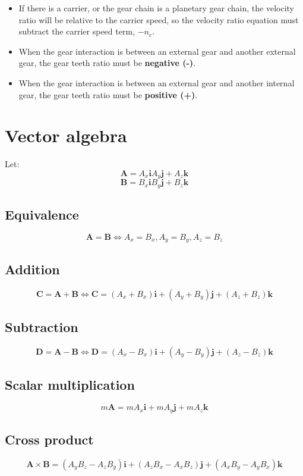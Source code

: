 \documentclass[11pt]{article}
\begin{document}
\begin{itemize}
\item If there is a carrier, or the gear chain is a planetary gear chain, the velocity ratio will be relative to the carrier speed, so the velocity ratio equation must subtract the carrier speed term, \(- n_c\).
\item When the gear interaction is between an external gear and another external gear, the gear teeth ratio must be \textbf{negative (-)}.
\item When the gear interaction is between an external gear and another internal gear, the gear teeth ratio must be \textbf{positive (+)}.
\end{itemize}

 \newpage
\section{Vector algebra}
\label{sec:org33b6696}
Let:
\[\boldsymbol{A} = A_x \boldsymbol{i} A_y \boldsymbol{j} + A_z \boldsymbol{k}\]
\[\boldsymbol{B} = B_x \boldsymbol{i} B_y \boldsymbol{j} + B_z \boldsymbol{k}\]
\subsection{Equivalence}
\label{sec:org7bd0be7}
\[\boldsymbol{A} = \boldsymbol{B} \Leftrightarrow A_x = B_x, A_y = B_y, A_z = B_z\]
\subsection{Addition}
\label{sec:orga506492}
\[\boldsymbol{C} = \boldsymbol{A} + \boldsymbol{B} \Leftrightarrow \boldsymbol{C} = (A_x + B_x) \boldsymbol{i} + (A_y + B_y) \boldsymbol{j} + (A_z + B_z) \boldsymbol{k}\]
\subsection{Subtraction}
\label{sec:org453d20a}
\[\boldsymbol{D} = \boldsymbol{A} - \boldsymbol{B} \Leftrightarrow \boldsymbol{D} = (A_x - B_x) \boldsymbol{i} + (A_y - B_y) \boldsymbol{j} + (A_z - B_z) \boldsymbol{k}\]
\subsection{Scalar multiplication}
\label{sec:org7ef2e71}
\[m \boldsymbol{A} = mA_x \boldsymbol{i} + mA_y \boldsymbol{j} + mA_z \boldsymbol{k}\]
\subsection{Cross product}
\label{sec:org4c4dc6c}
\[\boldsymbol{A} \times \boldsymbol{B} = (A_y B_z - A_z B_y) \boldsymbol{i} + (A_z B_x - A_x B_z) \boldsymbol{j} + (A_x B_y - A_y B_x) \boldsymbol{k}\]
\end{document}
